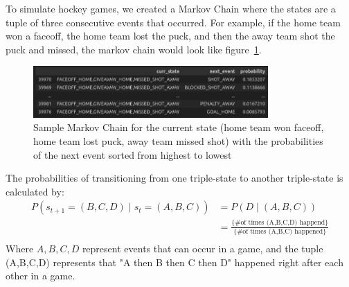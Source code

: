 \documentclass[11pt]{article}
\begin{document}
To simulate hockey games, we created a Markov Chain where the states are a tuple of three consecutive
events that occurred. For example, if the home team won a faceoff, the home team lost the puck, and 
then the away team shot the puck and missed, the markov chain would look like figure~\ref{fig:markov_chain_sample}.

\begin{figure}[H]
    \centering
    \includegraphics[width=0.8\textwidth]{images/markov_chain_sample.png}
    \caption{Sample Markov Chain for the current state (home team won faceoff, 
    home team lost puck, away team missed shot) with the probabilities of the next event 
    sorted from highest to lowest}
    \label{fig:markov_chain_sample}
\end{figure}

The probabilities of transitioning from one triple-state to another triple-state is calculated by:
\begin{align*}
    P(s_{t+1} = (B,C,D) \;|\; s_t = (A,B,C)) &= P(D \;|\; (A,B,C)) \\
    &= \frac{\{ \text{\# of times (A,B,C,D) happend}\}}{\{ \text{\# of times (A,B,C) happened}\}} \\
\end{align*}
Where $A,B,C,D$ represent events that can occur in a game, and the tuple (A,B,C,D) represents that "A then 
B then C then D" happened right after each other in a game.
\end{document}
